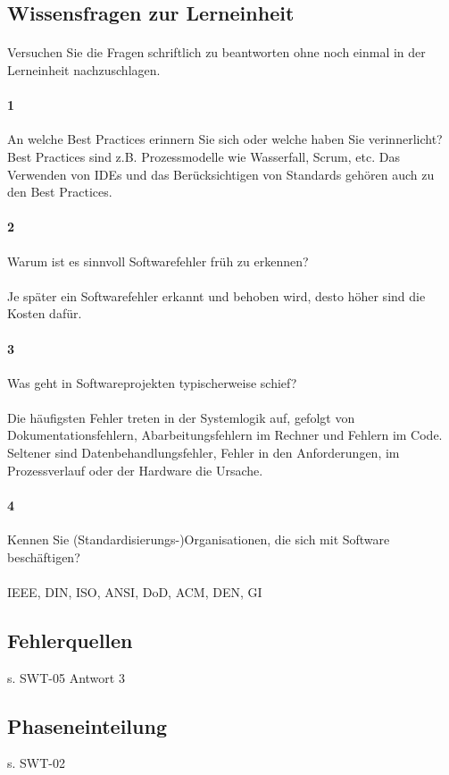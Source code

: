 \documentclass{article}
\begin{document}
\subsection{Wissensfragen zur Lerneinheit}
\paragraph{}
Versuchen Sie die Fragen schriftlich zu beantworten ohne noch einmal in der Lerneinheit nachzuschlagen.

\paragraph{1}
An welche Best Practices erinnern Sie sich oder welche haben Sie verinnerlicht? \\

Best Practices sind z.B. Prozessmodelle wie Wasserfall, Scrum, etc. Das
Verwenden von IDEs und das Berücksichtigen von Standards gehören auch zu den
Best Practices.

\paragraph{2}
Warum ist es sinnvoll Softwarefehler früh zu erkennen?

\paragraph{}
Je später ein Softwarefehler erkannt und behoben wird, desto höher sind die
Kosten dafür.

\paragraph{3}
Was geht in Softwareprojekten typischerweise schief?

\paragraph{}
Die häufigsten Fehler treten in der Systemlogik auf, gefolgt von Dokumentationsfehlern,
Abarbeitungsfehlern im Rechner und Fehlern im Code. Seltener sind Datenbehandlungsfehler,
Fehler in den Anforderungen, im Prozessverlauf oder der Hardware die Ursache.

\paragraph{4}
Kennen Sie (Standardisierungs-)Organisationen, die sich mit Software beschäftigen?

\paragraph{}
IEEE, DIN, ISO, ANSI, DoD, ACM, DEN, GI

\subsection{Fehlerquellen}
s. SWT-05 Antwort 3

\subsection{Phaseneinteilung}
s. SWT-02
\end{document}

